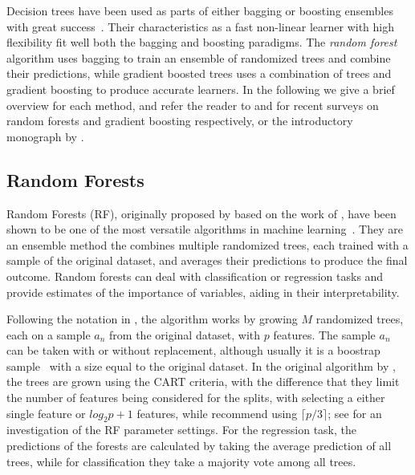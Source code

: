 Decision trees have been used as parts of either bagging
or boosting ensembles with great success~\cite{hundreds-classifiers, xgboost}. Their characteristics as a fast
non-linear learner
with high flexibility fit well both the bagging and boosting paradigms.
The \emph{random forest} algorithm uses bagging to train an ensemble
of randomized trees and combine their predictions, while gradient boosted trees
uses a combination of trees and gradient boosting to produce
accurate learners. In the following we give a brief overview for each method,
and refer the reader to \cite{random-forest-survey, tree-survey} and \cite{biau-optimization} for recent surveys on
random forests and gradient boosting respectively, or the introductory monograph by \citet{esl}.

\subsection{Random Forests}
\label{sec:bg-dt-random-forests}

Random Forests (RF), originally proposed by \citet{random-forests} based on the work
of \citet{amit-rf}, have been shown to be one of the
most versatile algorithms in machine learning~\cite{hundreds-classifiers}. They are an
ensemble method the combines multiple randomized trees, each trained with a sample
of the original dataset, and averages their predictions to produce the final outcome.
Random forests can deal with classification or regression tasks and provide estimates
of the importance of variables, aiding in their interpretability.

Following the notation in \citet{random-forest-survey}, the algorithm works by growing
$M$ randomized trees, each on a sample $a_n$ from the original dataset, with $p$ features.
The sample
$a_n$ can be taken with or without replacement, although usually it is a boostrap
sample~\cite{bootstrap} with a size equal to the original dataset. In the original
algorithm by \citeauthor{random-forests}, the trees are grown using the CART criteria,
with the difference that they limit the number of features being
considered for the splits, with \citeauthor{random-forests} selecting a either single feature or
$log_2{p} + 1$ features, while \citeauthor{random-forest-survey} recommend using $\lceil p/3 \rceil$;
see \cite{rf-parameters} for an investigation of the RF parameter settings.
For the regression task, the predictions of the forests are calculated
by taking the average prediction of all trees, while for classification
they take a majority vote among all trees.


